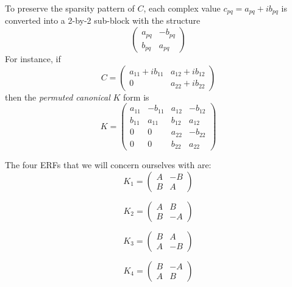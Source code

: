 \documentclass{report}
\begin{document}
To preserve the sparsity pattern of $C$, each complex value $c_{pq} =
a_{pq} + ib_{pq}$ is converted into a 2-by-2 sub-block with the structure
\begin{equation*} \left(
\begin{array}{rr} a_{pq} & -b_{pq} \\ b_{pq} & a_{pq}
\end{array}
\right)
\end{equation*}
For instance, if
\begin{equation*} C = \left(
\begin{array}{cc} a_{11} + i b_{11} & a_{12} + i b_{12} \\
0 & a_{22} + i b_{22}
\end{array}
\right)
\end{equation*}
then the \emph{permuted canonical} $K$ form is
\begin{equation*} K = \left(
\begin{array}{cccc} a_{11} & -b_{11} & a_{12} & -b_{12}
\\ b_{11} & a_{11} & b_{12} & a_{12} \\ 0 & 0 & a_{22} &
-b_{22} \\ 0 & 0 & b_{22} & a_{22} \end{array}
\right)
\end{equation*}

The four ERFs that we will concern ourselves with are:
\begin{equation*} K_1 = \left(
\begin{array}{rr} A & -B \\ B & A \end{array} \right)
\end{equation*}

\begin{equation*} K_2 = \left(
\begin{array}{rr} A & B \\ B & -A \end{array} \right)
\end{equation*}

\begin{equation*} K_3 = \left(
\begin{array}{rr} B & A \\ A & -B \end{array} \right)
\end{equation*}

\begin{equation*} K_4 = \left(
\begin{array}{rr} B & -A \\ A & B \end{array} \right)
\end{equation*}
\end{document}
